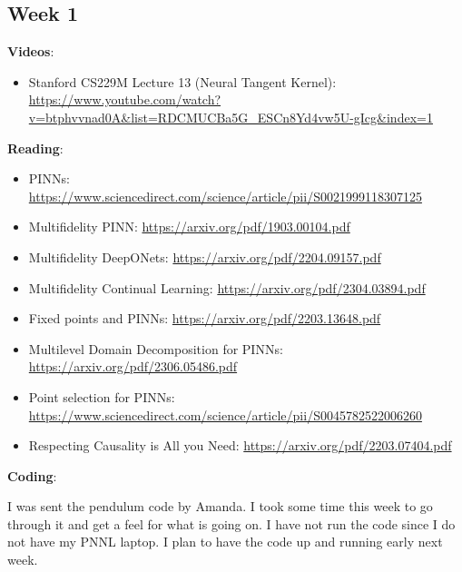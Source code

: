 \documentclass{article}
\def\bf{\textbf}
\begin{document}
\subsection*{Week 1}
\bf{Videos}:
\begin{itemize}
	\item Stanford CS229M Lecture 13 (Neural Tangent Kernel): \url{https://www.youtube.com/watch?v=btphvvnad0A&list=RDCMUCBa5G_ESCn8Yd4vw5U-gIcg&index=1}
\end{itemize}
\bf{Reading}:
\begin{itemize}
	\item PINNs: \url{https://www.sciencedirect.com/science/article/pii/S0021999118307125}
	\item Multifidelity PINN: \url{https://arxiv.org/pdf/1903.00104.pdf}
	\item Multifidelity DeepONets: \url{https://arxiv.org/pdf/2204.09157.pdf}
	\item Multifidelity Continual Learning: \url{https://arxiv.org/pdf/2304.03894.pdf}
	\item Fixed points and PINNs: \url{https://arxiv.org/pdf/2203.13648.pdf}
	\item Multilevel Domain Decomposition for PINNs: \url{https://arxiv.org/pdf/2306.05486.pdf}
	\item Point selection for PINNs: \url{https://www.sciencedirect.com/science/article/pii/S0045782522006260}
	\item Respecting Causality is All you Need: \url{https://arxiv.org/pdf/2203.07404.pdf}
\end{itemize}
\bf{Coding}:\\
\par I was sent the pendulum code by Amanda. I took some time this week to go through it and get a feel for what is going on. I have not run the code since I do not have my PNNL laptop. I plan to have the code up and running early next week.
\newpage
\end{document}
